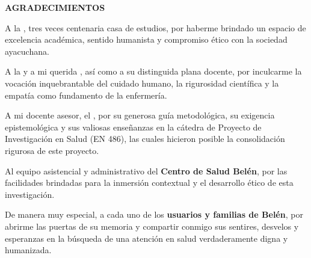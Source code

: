 \thispagestyle{empty}
\vspace*{2.0cm}

\begin{center}
    {\fontsize{14}{17}\selectfont\bfseries AGRADECIMIENTOS}
\end{center}
\vspace{1.0cm}

\noindent A la \textbf{\metaUniversidad}, tres veces centenaria casa de estudios, por haberme brindado un espacio de excelencia académica, sentido humanista y compromiso ético con la sociedad ayacuchana.

\vspace{0.4cm}
\noindent A la \textbf{\metaFacultad} y a mi querida \textbf{\metaEscuela}, así como a su distinguida plana docente, por inculcarme la vocación inquebrantable del cuidado humano, la rigurosidad científica y la empatía como fundamento de la enfermería.

\vspace{0.4cm}
\noindent A mi docente asesor, el \textbf{\metaAsesor}, por su generosa guía metodológica, su exigencia epistemológica y sus valiosas enseñanzas en la cátedra de Proyecto de Investigación en Salud (EN 486), las cuales hicieron posible la consolidación rigurosa de este proyecto.

\vspace{0.4cm}
\noindent Al equipo asistencial y administrativo del \textbf{Centro de Salud Belén}, por las facilidades brindadas para la inmersión contextual y el desarrollo ético de esta investigación.

\vspace{0.4cm}
\noindent De manera muy especial, a cada uno de los \textbf{usuarios y familias de Belén}, por abrirme las puertas de su memoria y compartir conmigo sus sentires, desvelos y esperanzas en la búsqueda de una atención en salud verdaderamente digna y humanizada.

\newpage
